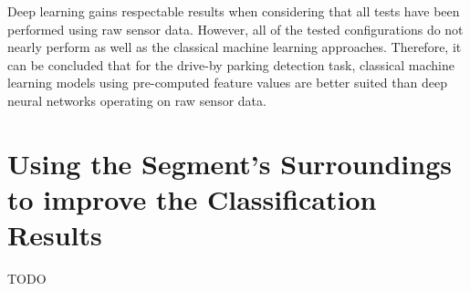 Deep learning gains respectable results when considering that all tests have been performed using raw sensor data. However, all of the tested configurations do not nearly perform as well as the classical machine learning approaches. Therefore, it can be concluded that for the drive-by parking detection task, classical machine learning models using pre-computed feature values are better suited than deep neural networks operating on raw sensor data.



\section{Using the Segment's Surroundings to improve the Classification Results}
\label{sec:using_surroundings_to_improve_results}

TODO



